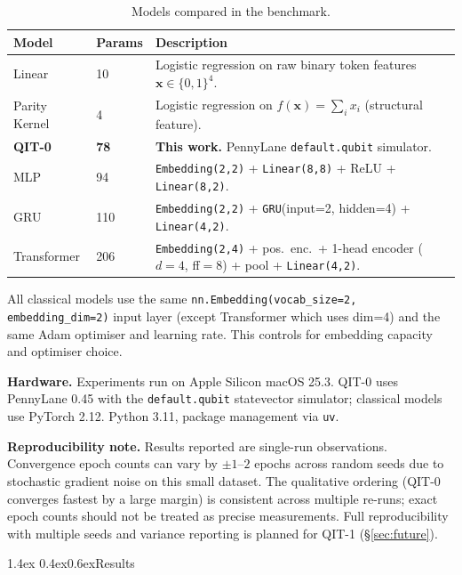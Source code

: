 \documentclass[11pt,a4paper]{article}
\makeatletter
\renewcommand\section{\@startsection{section}{1}{\z@}%
  {1.4ex \@plus 0.4ex}{0.6ex}{\normalfont\large\bfseries}}
\makeatother
\begin{document}
\begin{table}[h]
\centering
\caption{Models compared in the benchmark.}
\label{tab:models}
\begin{tabular}{@{}llp{7.5cm}@{}}
\toprule
Model & Params & Description \\
\midrule
Linear        & 10  & Logistic regression on raw binary token features $\mathbf{x} \in \{0,1\}^4$. \\
Parity Kernel & 4   & Logistic regression on $f(\mathbf{x}) = \sum_i x_i$ (structural feature). \\
\textbf{QIT-0}& \textbf{78} & \textbf{This work.} PennyLane \texttt{default.qubit} simulator. \\
MLP           & 94  & \texttt{Embedding(2,2)} + \texttt{Linear(8,8)} + ReLU + \texttt{Linear(8,2)}. \\
GRU           & 110 & \texttt{Embedding(2,2)} + \texttt{GRU}(input=2, hidden=4) + \texttt{Linear(4,2)}. \\
Transformer   & 206 & \texttt{Embedding(2,4)} + pos.\ enc.\ + 1-head encoder ($d{=}4$, ff$=8$) + pool + \texttt{Linear(4,2)}. \\
\bottomrule
\end{tabular}
\end{table}

All classical models use the same \texttt{nn.Embedding(vocab\_size=2, embedding\_dim=2)}
input layer (except Transformer which uses dim=4) and the same Adam optimiser and
learning rate. This controls for embedding capacity and optimiser choice.

\textbf{Hardware.} Experiments run on Apple Silicon macOS 25.3. QIT-0 uses PennyLane
0.45 with the \texttt{default.qubit} statevector simulator; classical models use PyTorch
2.12. Python 3.11, package management via \texttt{uv}.

\textbf{Reproducibility note.} Results reported are single-run observations.
Convergence epoch counts can vary by $\pm1$--$2$ epochs across random seeds due to
stochastic gradient noise on this small dataset. The qualitative ordering (QIT-0 converges
fastest by a large margin) is consistent across multiple re-runs; exact epoch counts should
not be treated as precise measurements. Full reproducibility with multiple seeds and
variance reporting is planned for QIT-1 (\S\ref{sec:future}).

\section{Results}
\label{sec:results}
\end{document}
